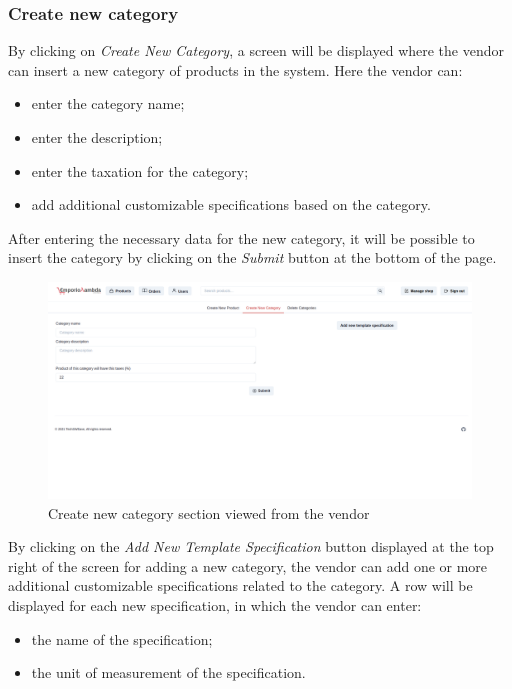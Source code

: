 \subsubsection{Create new category}
By clicking on \textit{Create New Category}, a screen will be displayed where the vendor can insert a new category of products in the system. Here the vendor can:
\begin {itemize}
\item enter the category name;
\item enter the description;
\item enter the taxation for the category;
\item add additional customizable specifications based on the category.
\end {itemize} 
After entering the necessary data for the new category, it will be possible to insert the category by clicking on the \textit{Submit} button at the bottom of the page.
\begin{figure}[!ht]
    \caption{Create new category section viewed from the vendor}
    \vspace{5px}
    \includegraphics[scale=0.25]{../../../../Images/userManual/createNewCategoryVendor.png}
    \centering
\end{figure}
By clicking on the \textit{Add New Template Specification} button displayed at the top right of the screen for adding a new category, the vendor can add one or more additional customizable specifications related to the category.
\linebreak
A row will be displayed for each new specification, in which the vendor can enter:
\begin {itemize}
\item the name of the specification;
\item the unit of measurement of the specification.
\end {itemize}
